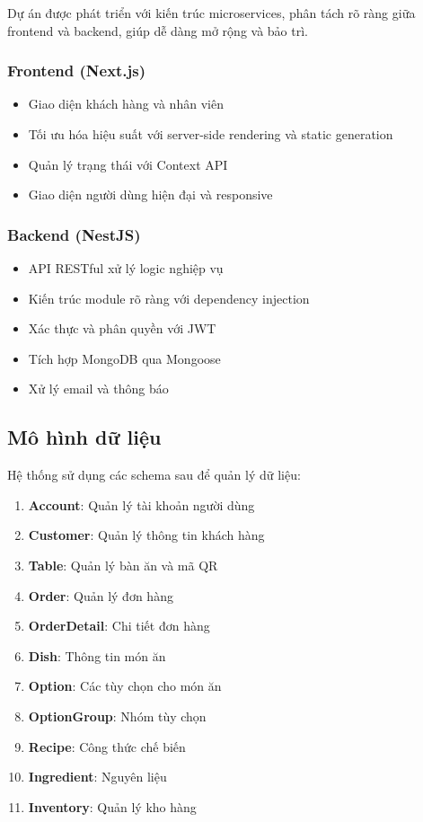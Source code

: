 \documentclass[a4paper]{article}
\begin{document}
    Dự án được phát triển với kiến trúc microservices, phân tách rõ ràng giữa frontend và backend, giúp dễ dàng mở rộng và bảo trì.
    
    \subsubsection{Frontend (Next.js)}
    \begin{itemize}
        \item Giao diện khách hàng và nhân viên
        \item Tối ưu hóa hiệu suất với server-side rendering và static generation
        \item Quản lý trạng thái với Context API
        \item Giao diện người dùng hiện đại và responsive
    \end{itemize}
    
    \subsubsection{Backend (NestJS)}
    \begin{itemize}
        \item API RESTful xử lý logic nghiệp vụ
        \item Kiến trúc module rõ ràng với dependency injection
        \item Xác thực và phân quyền với JWT
        \item Tích hợp MongoDB qua Mongoose
        \item Xử lý email và thông báo
    \end{itemize}
    
    \subsection{Mô hình dữ liệu}
    
    Hệ thống sử dụng các schema sau để quản lý dữ liệu:
    
    \begin{enumerate}
        \item \textbf{Account}: Quản lý tài khoản người dùng
        \item \textbf{Customer}: Quản lý thông tin khách hàng
        \item \textbf{Table}: Quản lý bàn ăn và mã QR
        \item \textbf{Order}: Quản lý đơn hàng
        \item \textbf{OrderDetail}: Chi tiết đơn hàng
        \item \textbf{Dish}: Thông tin món ăn
        \item \textbf{Option}: Các tùy chọn cho món ăn
        \item \textbf{OptionGroup}: Nhóm tùy chọn
        \item \textbf{Recipe}: Công thức chế biến
        \item \textbf{Ingredient}: Nguyên liệu
        \item \textbf{Inventory}: Quản lý kho hàng
    \end{enumerate}
\end{document}
